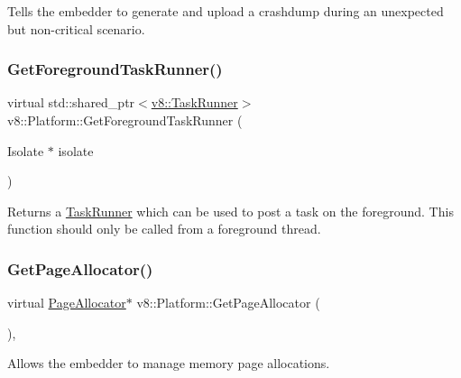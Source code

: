 Tells the embedder to generate and upload a crashdump during an unexpected but non-\/critical scenario. \mbox{\label{classv8_1_1Platform_af0d18c6bbefa133c5d11ec8a460d0278}} 
\subsubsection{\texorpdfstring{Get\+Foreground\+Task\+Runner()}{GetForegroundTaskRunner()}}
{\footnotesize\ttfamily virtual std\+::shared\+\_\+ptr$<$\mbox{\hyperlink{classv8_1_1TaskRunner}{v8\+::\+Task\+Runner}}$>$ v8\+::\+Platform\+::\+Get\+Foreground\+Task\+Runner (\begin{DoxyParamCaption}\item[{Isolate $\ast$}]{isolate }\end{DoxyParamCaption})\hspace{0.3cm}{\ttfamily [pure virtual]}}

Returns a \mbox{\hyperlink{classv8_1_1TaskRunner}{Task\+Runner}} which can be used to post a task on the foreground. This function should only be called from a foreground thread. \mbox{\label{classv8_1_1Platform_ab7c1886dd8131f7389b805bc98276702}} 
\subsubsection{\texorpdfstring{Get\+Page\+Allocator()}{GetPageAllocator()}}
{\footnotesize\ttfamily virtual \mbox{\hyperlink{classv8_1_1PageAllocator}{Page\+Allocator}}$\ast$ v8\+::\+Platform\+::\+Get\+Page\+Allocator (\begin{DoxyParamCaption}{ }\end{DoxyParamCaption})\hspace{0.3cm}{\ttfamily [inline]}, {\ttfamily [virtual]}}

Allows the embedder to manage memory page allocations. \mbox{\label{classv8_1_1Platform_aadb2594e6ff9a6f6a0657412ff5a7206}} 
